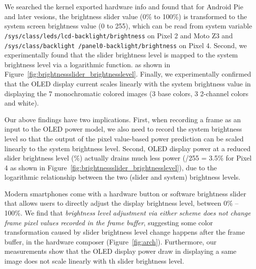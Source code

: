 We searched the kernel exported hardware info 
and  found that for Android Pie and later vesions, %
the brightness slider value (0\% to 100\%) is 
transformed to the system screen brightness value (0 to 255),
which can be read from system variable {\small \tt
  /sys/class/leds/lcd-backlight/brightness} on Pixel 2 and Moto Z3
and {{\small \tt /sys/class/backlight
    /panel0-backlight/brightness} on Pixel 4}.  
Second, we experimentally 
found that the slider brightness level is mapped 
to the system brightness level via a logarithmic function.
as shown in Figure~\ref{fig:brightnessslider_brightnesslevel}.
Finally, we experimentally confirmed that the OLED display current
scales linearly with the system brightness value in displaying the 7
monochromatic colored images (3 base colors, 3 2-channel colors and
white).


Our above findings have two implications.
First, when recording a frame as an input to the OLED power model,
we also need to record the system brightness level so that
the output of the pixel value-based power prediction
can be scaled linearly to the system brightness level.
Second, OLED display power at a reduced slider brightness level (\%)
actually drains much less power (/255 = 3.5\% for Pixel 4 as shown in Figure~\ref{fig:brightnessslider_brightnesslevel}), due to the logarithmic relationship
between the two (slider and system) brightness levels.


Modern smartphones come with a hardware button or software brightness
slider that allows users to directly adjust the display brightness
level, \eg between 0\% -- 100\%.  We find that {\em brightness level
  adjustment via either scheme does not change frame pixel values
  recorded in the frame buffer}, suggesting some color transformation
caused by slider brightness level change happens after the frame
buffer, \ie in the hardware composer (Figure~\ref{fig:arch}). 
Furthermore, our measurements show that 
the OLED display power draw in displaying a same image
does not scale linearly with th slider brightness level.


